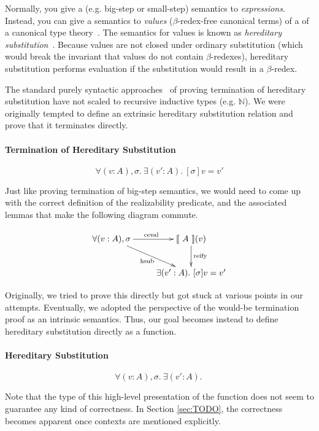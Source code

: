 \documentclass[preprint,nonatbib]{sigplanconf}
\numberwithin{mysubdfn}{mydfn}
\newcommand{\refsec}[1]{Section \ref{sec:#1}}
\def\nat{\mathbb{N}}
\newcommand{\hsub}[2]{[\sigma]#1=#2}
\newcommand{\ascribe}[2]{(#1 : #2)}
\newcommand{\all}[1]{\forall#1.~}
\newcommand{\ex}[1]{\exists#1.~}
\newcommand{\el}[1]{\llbracket ~ #1 ~ \rrbracket}
\newcommand{\fun}[1]{\textmd{#1}}
\begin{document}
Normally, you give a (e.g. big-step or small-step) semantics to
{\it expressions}. Instead, you can give a semantics to {\it values}
($\beta$-redex-free canonical terms) of a 
of a canonical type theory~\cite{TODO}. The semantics for values is
known as {\it hereditary substitution}~\cite{TODO}. Because values are
not closed under ordinary substitution (which would break the invariant that values
do not contain $\beta$-redexes), hereditary substitution
performs evaluation if the substitution would
result in a $\beta$-redex.

The standard purely syntactic approaches~\cite{TODO} of proving termination of
hereditary substitution have not scaled to recursive inductive types
(e.g. $\nat$). We were originally tempted to define an extrinsic
hereditary substitution relation and prove that it terminates directly.

\paragraph{Termination of Hereditary Substitution}

$$
\all{\ascribe{v}{A}, \sigma} \ex{\ascribe{v'}{A}} \hsub{v}{v'}
$$

Just like proving termination of big-step semantics, we would need to
come up with the correct definition of the realizability predicate,
and the associated lemmas that make the following diagram commute.

\begin{displaymath}
    \xymatrix{
          {\forall (v : A), \sigma} 
          \ar[dr]_{\fun{hsub}}
          \ar[r]^{\fun{ceval}}
        & {\el{A}(v)}
          \ar[d]^{\large{\fun{reify}}}
\\      & {\exists (v' : A). ~ [ \sigma ] v = v'} }
\end{displaymath}

Originally, we tried to prove this directly but got stuck at various
points in our attempts. Eventually, we adopted the perspective of the
would-be termination proof as an intrinsic semantics. Thus, our goal
becomes instead to define hereditary substitution directly as a
function.

\paragraph{Hereditary Substitution}
$$
\all{\ascribe{v}{A}, \sigma} \ex{\ascribe{v'}{A}}
$$

Note that the type of this high-level presentation of the function does
not seem to guarantee any kind of correctness. In \refsec{TODO}, the
correctness becomes apparent once contexts are mentioned explicitly.
\end{document}
